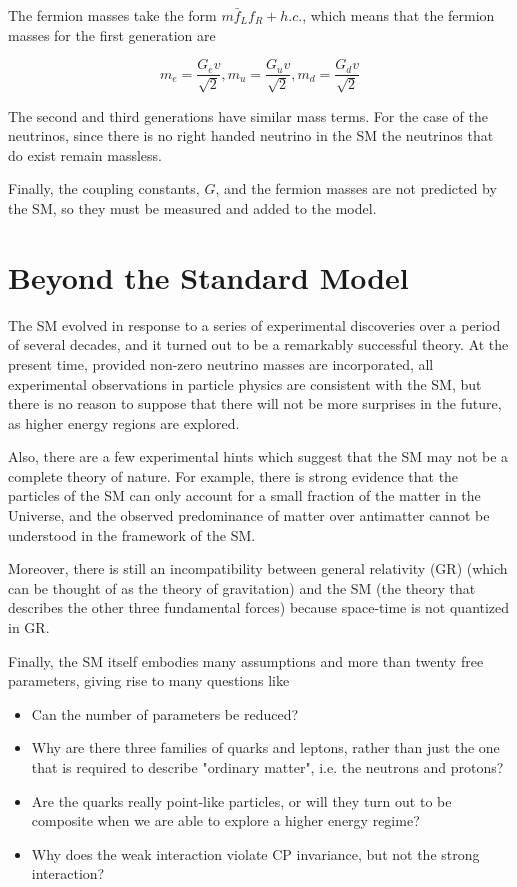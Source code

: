 	The fermion masses take the form $m\bar{f}_{L}f_{R} + h.c.$, which means that the fermion masses for the first generation are

		\begin{equation}
		m_{e} = \frac{G_{e}v}{\sqrt{2}}, m_{u}=\frac{G_{u}v}{\sqrt{2}}, m_{d}=\frac{G_{d}v}{\sqrt{2}} 
		\end{equation}

	The second and third generations have similar mass terms. For the case of the neutrinos, since there is no right handed neutrino in the SM the neutrinos that do exist remain massless.
	
	Finally, the coupling constants, $G$, and the fermion masses are not predicted by the SM, so they must be measured and added to the model.

\section{Beyond the Standard Model}

The SM evolved in response to a series of experimental discoveries over a period of several decades, and it turned out to be a remarkably successful theory. At the present time, provided non-zero neutrino masses are incorporated, all experimental observations in particle physics are consistent with the SM, but there is no reason to suppose that there will not be more surprises in the future, as higher energy regions are explored.

Also, there are a few experimental hints which suggest that the SM may not be a complete theory of nature. For example, there is strong evidence that the particles of the SM can only account for a small fraction of the matter in the Universe, and the observed predominance of matter over antimatter cannot be understood in the framework of the SM.

Moreover, there is still an incompatibility between general relativity (GR) (which can be thought of as the theory of gravitation) and the SM (the theory that describes the other three fundamental forces) because space-time is not quantized in GR.

Finally, the SM itself embodies many assumptions and more than twenty free parameters, giving rise to many questions like

\begin{itemize}
 \item Can the number of parameters be reduced?
 \item Why are there three families of quarks and leptons, rather than just the one that is required to describe "ordinary matter", i.e. the neutrons and protons?
 \item Are the quarks really point-like particles, or will they turn out to be composite when we are able to explore a higher energy regime?
 \item Why does the weak interaction violate CP invariance, but not the strong interaction?
\end{itemize}

